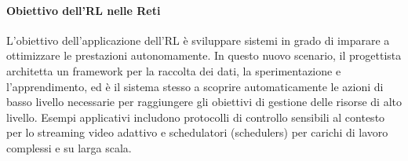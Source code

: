 \paragraph{Obiettivo dell'RL nelle Reti}

L'obiettivo dell'applicazione dell'RL è sviluppare sistemi in
grado di imparare a ottimizzare le prestazioni autonomamente.
In questo nuovo scenario, il progettista architetta un framework
per la raccolta dei dati, la sperimentazione e l'apprendimento,
ed è il sistema stesso a scoprire automaticamente le azioni di
basso livello necessarie per raggiungere gli obiettivi di
gestione delle risorse di alto livello. Esempi applicativi
includono protocolli di controllo sensibili al contesto per lo
streaming video adattivo e schedulatori (schedulers) per carichi
di lavoro complessi e su larga scala.


